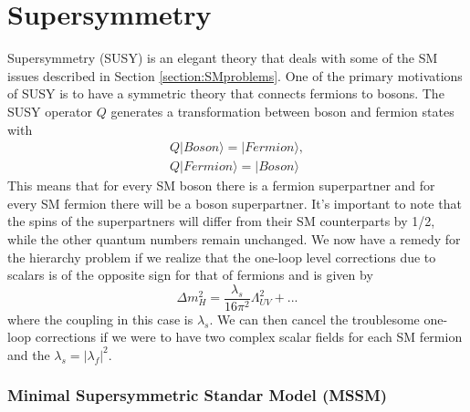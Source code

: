 \chapter{Supersymmetry}

Supersymmetry (SUSY) is an elegant theory that deals with some of the SM issues described in Section \ref{section:SMproblems}.  One of the primary motivations of SUSY is to have a symmetric theory that connects fermions to bosons.  The SUSY operator $Q$ generates a transformation between boson and fermion states with 
\begin{eqnarray}
	Q\vert Boson \rangle = \vert Fermion \rangle, \\
	Q\vert Fermion \rangle =  \vert Boson \rangle
\end{eqnarray}
This means that for every SM boson there is a fermion superpartner and for every SM fermion there will be a boson superpartner.  It's important to note that the spins of the superpartners will differ from their SM counterparts by 1/2, while the other quantum numbers remain unchanged.  We now have a remedy for the hierarchy problem if we realize that the one-loop level corrections due to scalars is of the opposite sign for that of fermions and is given by
\begin{equation}
	\Delta m_H^2 = \frac{\lambda_s}{16\pi^2}\Lambda_{UV}^2 + ...
\end{equation}
where the coupling in this case is $\lambda_s$.  We can then cancel the troublesome one-loop corrections if we were to have two complex scalar fields for each SM fermion and the $\lambda_s = |\lambda_f|^2$.\cite{Martin:1997ns}


\subsection{Minimal Supersymmetric Standar Model (MSSM)}

